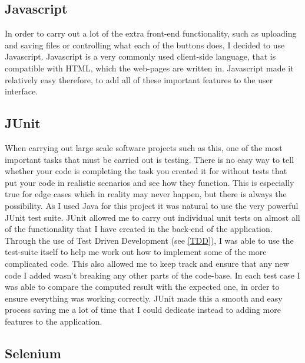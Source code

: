 \subsection{Javascript}

In order to carry out a lot of the extra front-end functionality, such as uploading and saving files or controlling what each of the buttons does, I decided to use Javascript. Javascript is a very commonly used client-side language, that is compatible with HTML, which the web-pages are written in. Javascript made it relatively easy therefore, to add all of these important features to the user interface. 

\subsection{JUnit\label{JUnit}}

When carrying out large scale software projects such as this, one of the most important tasks that must be carried out is testing. There is no easy way to tell whether your code is completing the task you created it for without tests that put your code in realistic scenarios and see how they function. This is especially true for edge cases which in reality may never happen, but there is always the possibility. As I used Java for this project it was natural to use the very powerful JUnit test suite. JUnit allowed me to carry out individual unit tests on almost all of the functionality that I have created in the back-end of the application. Through the use of Test Driven Development (see \ref{TDD}), I was able to use the test-suite itself to help me work out how to implement some of the more complicated code. This also allowed me to keep track and ensure that any new code I added wasn't breaking any other parts of the code-base. In each test case I was able to compare the computed result with the expected one, in order to ensure everything was working correctly. JUnit made this a smooth and easy process saving me a lot of time that I could dedicate instead to adding more features to the application.

\subsection{Selenium \label{selenium}}

